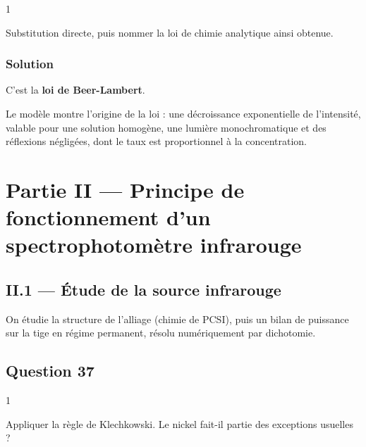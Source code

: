 \documentclass[11pt,a4paper]{article}
\newcommand{\equationajustee}[1]{%
  \sbox{\boiteequation}{$\displaystyle #1$}%
  \ifdim\wd\boiteequation>\linewidth
    \[\resizebox{\linewidth}{!}{\usebox{\boiteequation}}\]%
  \else
    \[#1\]%
  \fi}
\begin{document}
\begin{indication}{1}

Substitution directe, puis nommer la loi de chimie analytique ainsi obtenue.

\end{indication}

\hypertarget{solution-35}{%
\subsubsection{Solution}\label{solution-35}}

\equationajustee{\boxed{A=\epsilon_{em}c_0e}}
C'est la \textbf{loi de Beer-Lambert}.

\begin{methode}

Le modèle montre l'origine de la loi : une décroissance exponentielle de l'intensité, valable pour une solution homogène, une lumière monochromatique et des réflexions négligées, dont le taux est proportionnel à la concentration.

\end{methode}

\hypertarget{partie-ii-principe-de-fonctionnement-dun-spectrophotomuxe8tre-infrarouge}{%
\section{Partie II --- Principe de fonctionnement d'un spectrophotomètre infrarouge}\label{partie-ii-principe-de-fonctionnement-dun-spectrophotomuxe8tre-infrarouge}}

\hypertarget{ii.1-uxe9tude-de-la-source-infrarouge}{%
\subsection{II.1 --- Étude de la source infrarouge}\label{ii.1-uxe9tude-de-la-source-infrarouge}}

On étudie la structure de l'alliage (chimie de PCSI), puis un bilan de puissance sur la tige en régime permanent, résolu numériquement par dichotomie.

\hypertarget{question-37}{%
\subsection{Question 37}\label{question-37}}

\begin{indication}{1}

Appliquer la règle de Klechkowski. Le nickel fait-il partie des exceptions usuelles ?

\end{indication}
\end{document}
